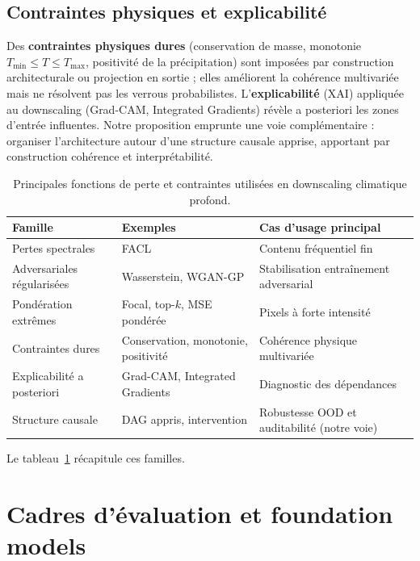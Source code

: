 \documentclass[14pt,a4paper,openany]{extreport}
\theoremstyle{definition}
\begin{document}
\subsection{Contraintes physiques et explicabilité}
\label{ssec:soa-physics-xai}

Des \textbf{contraintes physiques dures} (conservation de masse, monotonie $T_{\min} \leq T \leq T_{\max}$, positivité de la précipitation) sont imposées par construction architecturale ou projection en sortie ; elles améliorent la cohérence multivariée mais ne résolvent pas les verrous probabilistes. L'\textbf{explicabilité} (XAI) appliquée au downscaling (Grad-CAM, Integrated Gradients) révèle a posteriori les zones d'entrée influentes. Notre proposition emprunte une voie complémentaire : organiser l'architecture autour d'une structure causale apprise, apportant par construction cohérence et interprétabilité.

\begin{table}[ht]
  \centering
  \footnotesize
  \caption{Principales fonctions de perte et contraintes utilisées en downscaling climatique profond.}
  \label{tab:pertes}
  \begin{tabular}{p{3cm} p{3.5cm} p{5.5cm}}
    \toprule
    \textbf{Famille} & \textbf{Exemples} & \textbf{Cas d'usage principal} \\
    \midrule
    Pertes spectrales & FACL & Contenu fréquentiel fin\\
    Adversariales régularisées & Wasserstein, WGAN-GP & Stabilisation entraînement adversarial\\
    Pondération extrêmes & Focal, top-$k$, MSE pondérée & Pixels à forte intensité\\
    Contraintes dures & Conservation, monotonie, positivité & Cohérence physique multivariée\\
    Explicabilité a posteriori & Grad-CAM, Integrated Gradients & Diagnostic des dépendances\\
    Structure causale & DAG appris, intervention & Robustesse OOD et auditabilité (notre voie)\\
    \bottomrule
  \end{tabular}
\end{table}

Le tableau~\ref{tab:pertes} récapitule ces familles.

\section{Cadres d'évaluation et foundation models}
\label{sec:soa-benchmarks}
\end{document}
